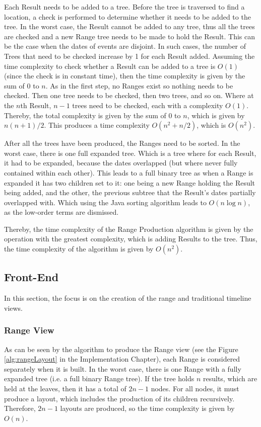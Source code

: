 \par Each Result needs to be added to a tree. Before the tree is traversed to find a location, a check is performed to determine whether it needs to be added to the tree. In the worst case, the Result cannot be added to any tree, thus all the trees are checked and a new Range tree needs to be made to hold the Result. This can be the case when the dates of events are disjoint.  In such cases, the number of Trees that need to be checked increase by 1 for each Result added. Assuming the time complexity to check whether a Result can be added to a tree is $O(1)$ (since the check is in constant time), then the time complexity is given by the sum of 0 to $n$. As in the first step, no Ranges exist so nothing needs to be checked. Then one tree needs to be checked, then two trees, and so on. Where at the $n$th Result, $n-1$ trees need to be checked, each with a complexity $O(1)$. Thereby, the total complexity is given by the sum of 0 to $n$, which is given by ${n(n+1)}/2$. This produces a time complexity $O({n^2+n}/2)$, which is $O(n^2)$.

\par After all the trees have been produced, the Ranges need to be sorted. In the worst case, there is one full expanded tree. Which is a tree where for each Result, it had to be expanded, because the dates overlapped (but where never fully contained within each other). This leads to a full binary tree as when a Range is expanded it has two children set to it: one being a new Range holding the Result being added, and the other, the previous subtree that the Result's dates partially overlapped with. Which using the Java sorting algorithm leads to $O(n\log n)$, as the low-order terms are dismissed.

\par Thereby, the time complexity of the Range Production algorithm is given by the operation with the greatest complexity, which is adding Results to the tree. Thus, the time complexity of the algorithm is given by $O(n^2)$.

\subsection{Front-End}
\par In this section, the focus is on the creation of the range and traditional timeline views.
\subsubsection{Range View}
\par As can be seen by the algorithm to produce the Range view (see the Figure \ref{alg:rangeLayout} in the Implementation Chapter), each Range is considered separately when it is built. In the worst case, there is one Range with a fully expanded tree (i.e. a full binary Range tree). If the tree holds $n$ results, which are held at the leaves, then it has a total of $2n-1$ nodes. For all nodes, it must produce a layout, which includes the production of its children recursively. Therefore, $2n-1$ layouts are produced, so the time complexity is given by $O(n)$. 

